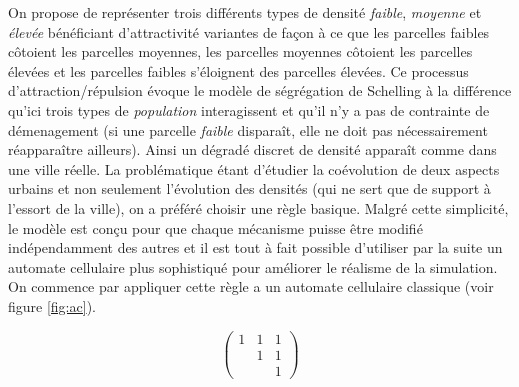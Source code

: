 \documentclass[12pt]{article}
\begin{document}
On propose de représenter trois différents types de densité
\textit{faible}, \textit{moyenne} et \textit{élevée} bénéficiant
d'attractivité variantes de façon à ce que les parcelles faibles
côtoient les parcelles moyennes, les parcelles moyennes côtoient les
parcelles élevées et les parcelles faibles s'éloignent des parcelles
élevées. Ce processus d'attraction/répulsion évoque le modèle de
ségrégation de Schelling à la différence qu'ici trois types de
\textit{population} interagissent et qu'il n'y a pas de contrainte de
démenagement (si une parcelle \textit{faible} disparaît, elle ne doit
pas nécessairement réapparaître ailleurs). Ainsi un dégradé discret de
densité apparaît comme dans une ville réelle. La problématique étant
d'étudier la coévolution de deux aspects urbains et non seulement
l'évolution des densités (qui ne sert que de support à l'essort de la
ville), on a préféré choisir une règle basique. Malgré cette
simplicité, le modèle est conçu pour que chaque mécanisme puisse être
modifié indépendamment des autres et il est tout à fait possible
d'utiliser par la suite un automate cellulaire plus sophistiqué pour
améliorer le réalisme de la simulation. On commence par appliquer
cette règle a un automate cellulaire classique (voir figure
\ref{fig:ac}).

\[
\begin{pmatrix}
  1 & 1 & 1 \\
    & 1 & 1 \\
    &   & 1
\end{pmatrix}\]
\end{document}
